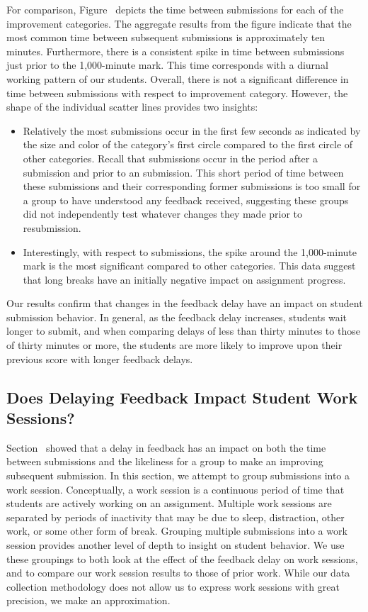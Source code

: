 For comparison, Figure~ depicts the time between
submissions for each of the improvement categories. The aggregate results from
the figure indicate that the most common time between subsequent submissions is
approximately ten minutes. Furthermore, there is a consistent spike in time
between submissions just prior to the 1,000-minute mark. This time corresponds
with a diurnal working pattern of our students. Overall, there is not a
significant difference in time between submissions with respect to improvement
category. However, the shape of the individual scatter lines provides two
insights:

\begin{itemize}
\item Relatively the most \noii{} submissions occur in the first few seconds as
  indicated by the size and color of the \noii{} category's first circle
  compared to the first circle of other categories. Recall that \noii{}
  submissions occur in the period after a \worse{} submission and prior to an
  \imp{} submission. This short period of time between these submissions and
  their corresponding former submissions is too small for a group to have
  understood any feedback received, suggesting these groups did not
  independently test whatever changes they made prior to resubmission.
\item Interestingly, with respect to \worse{} submissions, the spike around the
  1,000-minute mark is the most significant compared to other categories. This
  data suggest that long breaks have an initially negative impact on assignment
  progress.
\end{itemize}

Our results confirm that changes in the feedback delay have an impact on
student submission behavior. In general, as the feedback delay increases,
students wait longer to submit, and when comparing delays of less than thirty
minutes to those of thirty minutes or more, the students are more likely to
improve upon their previous score with longer feedback delays.

\subsection{Does Delaying Feedback Impact Student Work Sessions?}

Section~ showed that a delay in feedback has an impact
on both the time between submissions and the likeliness for a group to make an
improving subsequent submission. In this section, we attempt to group
submissions into a work session. Conceptually, a work session is a continuous
period of time that students are actively working on an assignment. Multiple
work sessions are separated by periods of inactivity that may be due to sleep,
distraction, other work, or some other form of break. Grouping multiple
submissions into a work session provides another level of depth to insight on
student behavior. We use these groupings to both look at the effect of the
feedback delay on work sessions, and to compare our work session results to
those of prior work. While our data collection methodology does not allow us to
express work sessions with great precision, we make an approximation.

